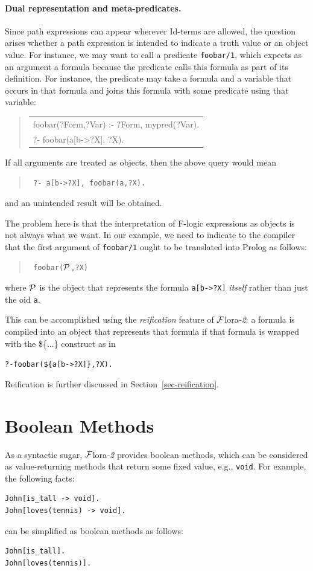 \documentclass[11pt]{article}
\newenvironment{qrules}{\begin{quote}\tt\begin{tabular}[t]{l}}%
{\end{tabular}\end{quote}}
\newcommand{\FLORA}{{\mbox{\sc ${\cal F}${lora}\rm\emph{-2}}}\xspace}
\newcommand{\fl}{\mbox{F-logic}\xspace}
\begin{document}
\paragraph{Dual representation and meta-predicates.}
Since path expressions can appear wherever Id-terms are allowed, the
question arises whether a path expression is intended to indicate a truth
value or an object value. For instance, we may want to call a
predicate {\tt foobar/1}, which expects as an argument
a formula because the predicate calls this formula as part of its definition.
For instance, the predicate may take a formula and a variable that occurs
in that formula and joins this formula with some predicate using that
variable:
\begin{qrules}
  foobar(?Form,?Var) :- ?Form, mypred(?Var).\\
  ?- foobar(a[b->?X], ?X).
\end{qrules}
If all arguments are treated as objects, then the above query would mean
\begin{quote}
 \tt
 ?- a[b->?X], foobar(a,?X).
\end{quote}
and an unintended result will be obtained.

The problem here is that the interpretation of \fl expressions as
objects is not always what we want. In our example, we need to indicate to the
compiler that the first argument of {\tt foobar/1} ought to be translated
into Prolog as follows:
\begin{quote}
 \tt
 foobar($\cal P$,?X)
\end{quote}
where $\cal P$ is the object that represents
the formula {\tt a[b->?X]} \emph{itself} rather than just
the oid {\tt a}.

This can be accomplished using the \emph{reification} feature of
\FLORA: a formula is compiled into an object that represents that formula if
that formula is wrapped with the \$\{...\} construct as in
\begin{alltt}
 ?- foobar(\$\{a[b->?X]\}, ?X).
\end{alltt}
Reification is further discussed in Section~\ref{sec-reification}.



\section{Boolean Methods}


As a syntactic sugar, \FLORA provides boolean methods, which can be
considered as value-returning methods that return some fixed value, e.g.,
{\tt void}. For example, the following facts:
\begin{verbatim}
John[is_tall -> void].
John[loves(tennis) -> void].
\end{verbatim}
can be simplified as boolean methods as follows:
\begin{verbatim}
John[is_tall].
John[loves(tennis)].
\end{verbatim}
\end{document}
